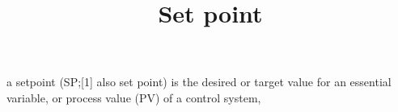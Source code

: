 \documentclass[a4paper]{article}
\title{Set point}
\date{}
\begin{document}
\maketitle
    a setpoint (SP;[1] also set point) is the desired or target value for an essential variable, or process value (PV) of a control system, 
\end{document}
